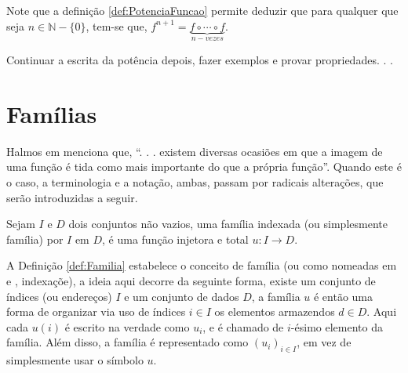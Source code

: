 Note que a definição \ref{def:PotenciaFuncao} permite deduzir que para qualquer que seja $n \in \mathbb{N} - \{0\}$, tem-se que, $f^{n+1} = \underbrace{f \circ \cdots \circ f}_{n-vezes}$.

{\color{red} Continuar a escrita da potência depois, fazer exemplos e provar propriedades. . . }

\section{Famílias}

Halmos em \cite{halmos2001} menciona que, ``. . . existem diversas ocasiões em que a imagem de uma função é tida como mais importante do que a própria função''. Quando este é o caso, a terminologia e a notação, ambas, passam por radicais alterações, que serão introduzidas a seguir.

\begin{definicao}\label{def:Familia}
	Sejam $I$ e $D$ dois conjuntos não vazios, uma família indexada (ou simplesmente família) por $I$ em $D$, é uma função injetora e total $u: I \rightarrow D$.
\end{definicao}

A Definição \ref{def:Familia} estabelece o conceito de família (ou como nomeadas em \cite{halmos2001} e \cite{carmo2013}, indexaçõe), a ideia aqui decorre da seguinte forma, existe um conjunto de índices (ou endereços) $I$ e um conjunto de dados $D$, a família $u$ é então uma forma de organizar via uso de índices $i \in I$ os elementos armazendos $d \in D$. Aqui cada $u(i)$ é escrito na verdade como $u_i$, e é chamado de $i$-ésimo elemento da família. Além disso, a família é representado como $(u_i)_{i \in I}$, em vez de simplesmente usar o símbolo $u$. 











